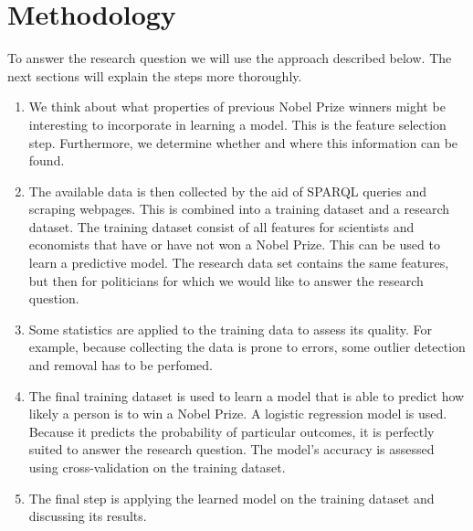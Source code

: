 \section{Methodology}
\label{sec:methodology}
To answer the research question we will use the approach described below. The next sections will explain the steps more thoroughly.
\begin{enumerate}
\item We think about what properties of previous Nobel Prize winners might be interesting to incorporate in learning a model. This is the feature selection step. Furthermore, we determine whether and where this information can be found.
\item The available data is then collected by the aid of SPARQL queries and scraping webpages. This is combined into a training dataset and a research dataset. The training dataset consist of all features for scientists and economists that have or have not won a Nobel Prize. This can be used to learn a predictive model. The research data set contains the same features, but then for politicians for which we would like to answer the research question.
\item Some statistics are applied to the training data to assess its quality. For example, because collecting the data is prone to errors, some outlier detection and removal has to be perfomed.
\item The final training dataset is used to learn a model that is able to predict how likely a person is to win a Nobel Prize. A logistic regression model is used. Because it predicts the probability of particular outcomes, it is perfectly suited to answer the research question. The model's accuracy is assessed using cross-validation on the training dataset.
\item The final step is applying the learned model on the training dataset and discussing its results. 
\end{enumerate}
